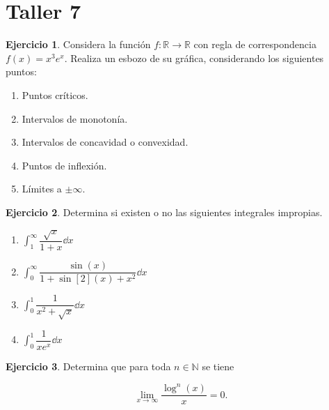 \documentclass{article}
\theoremstyle{definicion}
\theoremstyle{definition}             %
\theoremstyle{definition}             %
\theoremstyle{definition}
\theoremstyle{definition}
\theoremstyle{observacion}
\theoremstyle{definition}
\theoremstyle{plain}
\theoremstyle{definition}
\theoremstyle{afirmacion}
\theoremstyle{definition}
\newtheorem{eje}{Ejercicio}
\begin{document}
    \section{Taller 7}

    \begin{eje}
        Considera la función \(f \colon \mathbb{R} \to \mathbb{R}\) con regla de correspondencia \(f(x) = x^{3}e^{x}\). Realiza un esbozo de su gráfica, considerando los siguientes puntos:
        \begin{enumerate}[label = \alph*)]
            \item Puntos críticos.
            \item Intervalos de monotonía.
            \item Intervalos de concavidad o convexidad.
            \item Puntos de inflexión.
            \item Límites a \(\pm \infty\).
        \end{enumerate}
    \end{eje}

    \begin{eje}
        Determina si existen o no las siguientes integrales impropias.

        \begin{multicols}{2}
            \begin{enumerate}[label = \alph*)]
                \item \(\int_{1}^{\infty} \dfrac{\sqrt{x}}{1 + x}\dd{x}\)
                \item \(\int_{0}^{\infty} \dfrac{\sin(x)}{1 + \sin[2](x) + x^{2}}\dd{x}\)
                \item \(\int_{0}^{1}\dfrac{1}{x^{2} + \sqrt{x}}\dd{x}\)
                \item \(\int_{0}^{1}\dfrac{1}{xe^{x}}\dd{x}\)
            \end{enumerate}
        \end{multicols}
    \end{eje}

    \begin{eje}
        Determina que para toda \(n\in\mathbb{N}\) se tiene 

        \begin{equation*}
            \lim_{x\to\infty}\dfrac{\log^{n}(x)}{x} = 0.
        \end{equation*}
    \end{eje}
\end{document}

